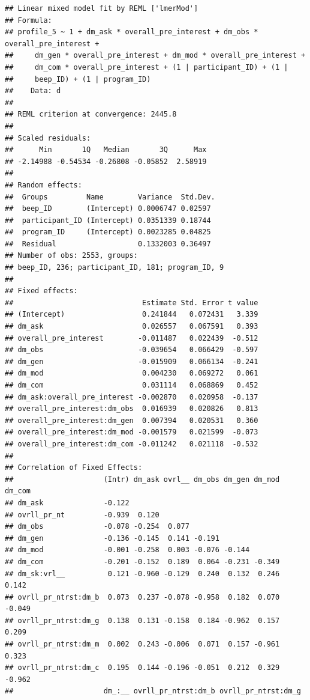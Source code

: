 \documentclass[]{msu-thesis}
\theoremstyle{definition}
\theoremstyle{definition}
\theoremstyle{definition}
\theoremstyle{remark}
\begin{document}
\begin{verbatim}
## Linear mixed model fit by REML ['lmerMod']
## Formula: 
## profile_5 ~ 1 + dm_ask * overall_pre_interest + dm_obs * overall_pre_interest +  
##     dm_gen * overall_pre_interest + dm_mod * overall_pre_interest +  
##     dm_com * overall_pre_interest + (1 | participant_ID) + (1 |  
##     beep_ID) + (1 | program_ID)
##    Data: d
## 
## REML criterion at convergence: 2445.8
## 
## Scaled residuals: 
##      Min       1Q   Median       3Q      Max 
## -2.14988 -0.54534 -0.26808 -0.05852  2.58919 
## 
## Random effects:
##  Groups         Name        Variance  Std.Dev.
##  beep_ID        (Intercept) 0.0006747 0.02597 
##  participant_ID (Intercept) 0.0351339 0.18744 
##  program_ID     (Intercept) 0.0023285 0.04825 
##  Residual                   0.1332003 0.36497 
## Number of obs: 2553, groups:  
## beep_ID, 236; participant_ID, 181; program_ID, 9
## 
## Fixed effects:
##                              Estimate Std. Error t value
## (Intercept)                  0.241844   0.072431   3.339
## dm_ask                       0.026557   0.067591   0.393
## overall_pre_interest        -0.011487   0.022439  -0.512
## dm_obs                      -0.039654   0.066429  -0.597
## dm_gen                      -0.015909   0.066134  -0.241
## dm_mod                       0.004230   0.069272   0.061
## dm_com                       0.031114   0.068869   0.452
## dm_ask:overall_pre_interest -0.002870   0.020958  -0.137
## overall_pre_interest:dm_obs  0.016939   0.020826   0.813
## overall_pre_interest:dm_gen  0.007394   0.020531   0.360
## overall_pre_interest:dm_mod -0.001579   0.021599  -0.073
## overall_pre_interest:dm_com -0.011242   0.021118  -0.532
## 
## Correlation of Fixed Effects:
##                     (Intr) dm_ask ovrl__ dm_obs dm_gen dm_mod dm_com
## dm_ask              -0.122                                          
## ovrll_pr_nt         -0.939  0.120                                   
## dm_obs              -0.078 -0.254  0.077                            
## dm_gen              -0.136 -0.145  0.141 -0.191                     
## dm_mod              -0.001 -0.258  0.003 -0.076 -0.144              
## dm_com              -0.201 -0.152  0.189  0.064 -0.231 -0.349       
## dm_sk:vrl__          0.121 -0.960 -0.129  0.240  0.132  0.246  0.142
## ovrll_pr_ntrst:dm_b  0.073  0.237 -0.078 -0.958  0.182  0.070 -0.049
## ovrll_pr_ntrst:dm_g  0.138  0.131 -0.158  0.184 -0.962  0.157  0.209
## ovrll_pr_ntrst:dm_m  0.002  0.243 -0.006  0.071  0.157 -0.961  0.323
## ovrll_pr_ntrst:dm_c  0.195  0.144 -0.196 -0.051  0.212  0.329 -0.962
##                     dm_:__ ovrll_pr_ntrst:dm_b ovrll_pr_ntrst:dm_g

\end{verbatim}
\end{document}

